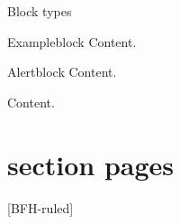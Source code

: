 \documentclass[
    ngerman,%
    authorontitle=true,
]{bfhbeamer}
\begin{document}
    \begin{frame}{Block types}
        \begin{exampleblock}{Exampleblock}
            Content.
        \end{exampleblock}
        \begin{alertblock}{Alertblock}
            Content.
        \end{alertblock}
        \begin{example}
            Content.
        \end{example}
    \end{frame}

    \section{section pages}

    [BFH-ruled]
    \frame{\sectionpage}





\end{document}
